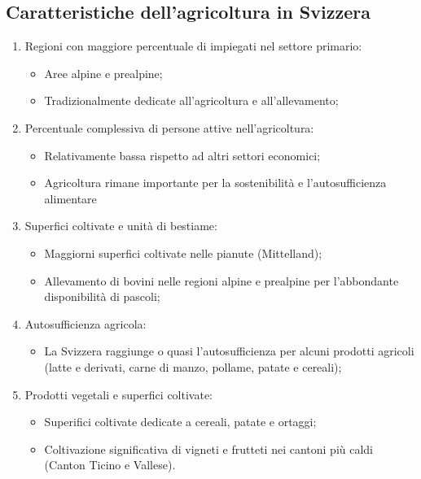 \documentclass{article}
\begin{document}
\subsection{Caratteristiche dell'agricoltura in Svizzera}
\begin{enumerate}
    \item Regioni con maggiore percentuale di impiegati nel settore primario:
        \begin{itemize}
            \item Aree alpine e prealpine;
            \item Tradizionalmente dedicate all'agricoltura e all'allevamento;
        \end{itemize}
    \item Percentuale complessiva di persone attive nell'agricoltura:
        \begin{itemize}
            \item Relativamente bassa rispetto ad altri settori economici;
            \item Agricoltura rimane importante per la sostenibilità e l'autosufficienza
                alimentare 
        \end{itemize}
    \item Superfici coltivate e unità di bestiame:
        \begin{itemize}
            \item Maggiorni superfici coltivate nelle pianute (Mittelland);
            \item Allevamento di bovini nelle regioni alpine e prealpine per l'abbondante
                disponibilità di pascoli;
        \end{itemize}
    \item Autosufficienza agricola:
        \begin{itemize}
            \item La Svizzera raggiunge o quasi l'autosufficienza per alcuni prodotti agricoli
                (latte e derivati, carne di manzo, pollame, patate e cereali);
        \end{itemize}
    \item Prodotti vegetali e superfici coltivate:
        \begin{itemize}
            \item Superifici coltivate dedicate a cereali, patate e ortaggi;
            \item Coltivazione significativa di vigneti e frutteti nei cantoni più caldi
                (Canton Ticino e Vallese).
        \end{itemize}
\end{enumerate}
\end{document}
